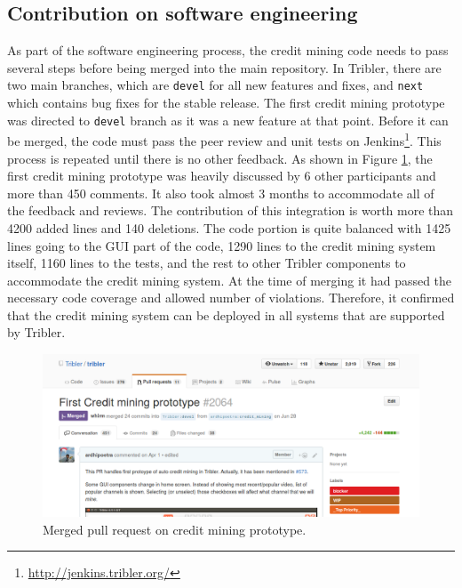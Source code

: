 \subsection{Contribution on software engineering}
As part of the software engineering process, the credit mining code needs to pass several steps before being merged into the main repository. In Tribler, there are two main branches, which are \texttt{devel} for all new features and fixes, and \texttt{next} which contains bug fixes for the stable release. The first credit mining prototype was directed to \texttt{devel} branch as it was a new feature at that point. Before it can be merged, the code must pass the peer review and unit tests on Jenkins\footnote{\url{http://jenkins.tribler.org/}}. This process is repeated until there is no other feedback. As shown in Figure \ref{fig:cmpullrequest}, the first credit mining prototype was heavily discussed by 6 other participants and more than 450 comments. It also took almost 3 months to accommodate all of the feedback and reviews. The contribution of this integration is worth more than 4200 added lines and 140 deletions. The code portion is quite balanced with 1425 lines going to the GUI part of the code, 1290 lines to the credit mining system itself, 1160 lines to the tests, and the rest to other Tribler components to accommodate the credit mining system. At the time of merging it had passed the necessary code coverage and allowed number of violations. Therefore, it confirmed that the credit mining system can be deployed in all systems that are supported by Tribler. 

\begin{figure}[h]
	\centering
	\includegraphics[width=\textwidth]{pics/cm_pr_crop.png}
	\caption[Merged pull request on credit mining prototype]{Merged pull request on credit mining prototype\footnotemark.}
	\label{fig:cmpullrequest}
\end{figure}


